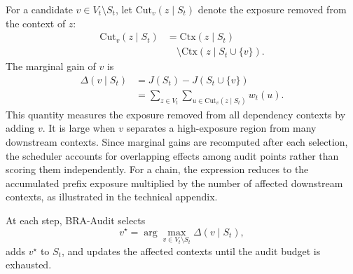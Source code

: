 \documentclass[letterpaper]{article} %
\begin{document}
For a candidate \(v\in V_t\setminus S_t\), let
\(\mathrm{Cut}_v(z\mid S_t)\) denote the exposure removed
from the context of \(z\):
\begin{equation}
\begin{aligned}
\mathrm{Cut}_v(z\mid S_t)
&=
\mathrm{Ctx}(z\mid S_t)\\
&\quad\setminus
\mathrm{Ctx}(z\mid S_t\cup\{v\}).
\end{aligned}
\end{equation}
The marginal gain of \(v\) is
\begin{equation}
\begin{aligned}
\Delta(v\mid S_t)
&=
J(S_t)-J(S_t\cup\{v\})\\
&=
\sum_{z\in V_t}
\sum_{u\in\mathrm{Cut}_v(z\mid S_t)}
w_t(u).
\end{aligned}
\end{equation}
This quantity measures the exposure removed from all
dependency contexts by adding \(v\). It is large when \(v\)
separates a high-exposure region from many downstream
contexts. Since marginal gains are recomputed after each
selection, the scheduler accounts for overlapping effects
among audit points rather than scoring them independently.
For a chain, the expression reduces to the accumulated prefix
exposure multiplied by the number of affected downstream
contexts, as illustrated in the technical appendix.





At each step, BRA-Audit selects
\begin{equation}
v^\star
=
\arg\max_{v\in V_t\setminus S_t}
\Delta(v\mid S_t),
\end{equation}
adds \(v^\star\) to \(S_t\), and updates the affected contexts
until the audit budget is exhausted.
\end{document}
